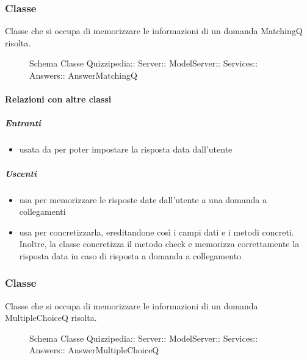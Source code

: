 \subsubsection{Classe }
Classe che si occupa di memorizzare le informazioni di un domanda MatchingQ risolta.
\begin{figure}[H]
\centering
\noindent{}
\caption[Schema Classe AnswerMatchingQ]{Schema Classe Quizzipedia:: Server:: ModelServer:: Services:: Answers:: AnswerMatchingQ}
\end{figure}
\paragraph{Relazioni con altre classi}
\subparagraph{Entranti}
\begin{itemize}
\item usata da  per poter impostare la risposta data dall'utente
\end{itemize}
\subparagraph{Uscenti}
\begin{itemize}
\item usa  per memorizzare le risposte date dall'utente a una domanda a collegamenti
\item usa  per concretizzarla, ereditandone così i campi dati e i metodi concreti. Inoltre, la classe concretizza il metodo check e memorizza correttamente la risposta data in caso di risposta a domanda a collegamento
\end{itemize}
\subsubsection{Classe }
Classe che si occupa di memorizzare le informazioni di un domanda MultipleChoiceQ risolta.
\begin{figure}[H]
\centering
\noindent{}
\caption[Schema Classe AnswerMultipleChoiceQ]{Schema Classe Quizzipedia:: Server:: ModelServer:: Services:: Answers:: AnswerMultipleChoiceQ}
\end{figure}
